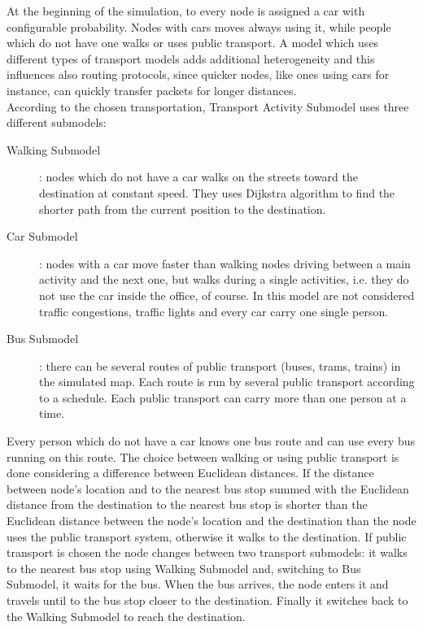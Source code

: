 At the beginning of the simulation, to every node is assigned a car with configurable probability. Nodes with cars moves always using it, while people which do not have one walks or uses public transport. A model which uses different types of transport models adds additional heterogeneity and this influences also routing protocols, since quicker nodes, like ones using cars for instance, can quickly transfer packets for longer distances.
\\

According to the chosen transportation, Transport Activity Submodel uses three different submodels:
\\

\begin{description}
\item [Walking Submodel]: nodes which do not have a car walks on the streets toward the destination at constant speed. They uses Dijkstra algorithm to find the shorter path from the current position to the destination.

\item [Car Submodel]: nodes with a car move faster than walking nodes driving between a main activity and the next one, but walks during a single activities, i.e. they do not use the car inside the office, of course. In this model are not considered traffic congestions, traffic lights and every car carry one single person.

\item [Bus Submodel]: there can be several routes of public transport (buses, trams, trains) in the simulated map. Each route is run by several public transport according to a schedule. Each public transport can carry more than one person at a time.
\end{description}

Every person which do not have a car knows one bus route and can use every bus running on this route. The choice between walking or using public transport is done considering a difference between Euclidean distances. If the distance between node's location and to the nearest bus stop summed with the Euclidean distance from the destination to the nearest bus stop is shorter than the Euclidean distance between the node's location and the destination than the node uses the public transport system, otherwise it walks to the destination. If public transport is chosen the node changes between two transport submodels: it walks to the nearest bus stop using Walking Submodel and, switching to Bus Submodel, it waits for the bus. When the bus arrives, the node enters it and travels until to the bus stop closer to the destination. Finally it switches back to the Walking Submodel to reach the destination.
 

